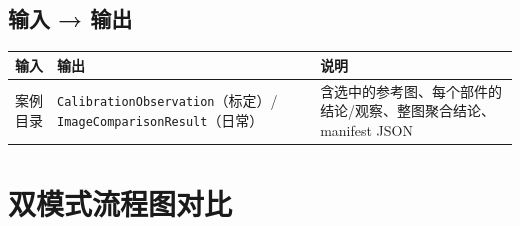 \documentclass[12pt,a4paper]{ctexart}
\begin{document}
\subsection*{输入 → 输出}
\noindent\begin{tabular}{|p{4cm}|p{4cm}|p{5cm}|}
\hline
\textbf{输入} & \textbf{输出} & \textbf{说明} \\
\hline
案例目录 & \texttt{CalibrationObservation}（标定）/ \texttt{ImageComparisonResult}（日常） & 含选中的参考图、每个部件的结论/观察、整图聚合结论、manifest JSON \\
\hline
\end{tabular}


\section{双模式流程图对比}
\end{document}
